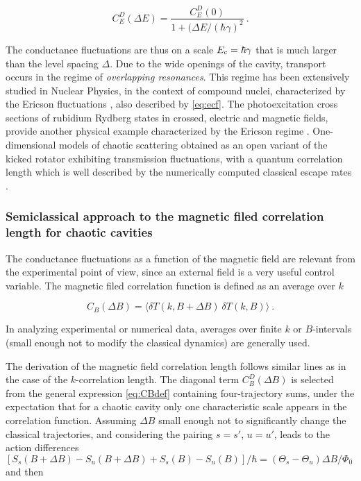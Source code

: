 \documentclass[a4paper,10pt]{article}
\newcommand{\nin}{\noindent}
\newcommand{\be}{\begin{equation}}
\newcommand{\ee}{\end{equation}}
\newcommand{\dlB}{\Delta B}
\newcommand{\dlT}{\delta T}
\begin{document}
\be
C_E^D (\Delta E) = \frac{C_E^D(0)}{1 + (\Delta E/(\hbar \gamma)^2} \ .
\label{eq:ecf}
\ee

\nin The conductance fluctuations are thus on a scale $E_{\rm c}=\hbar \gamma$ that is much larger than the level spacing $\Delta$. Due to the wide openings of the cavity, transport occurs in the regime of {\it overlapping resonances}. This regime has been extensively studied in 
Nuclear Physics, in the context of compound nuclei, characterized by the Ericson fluctuations \cite{Eric60}, also described by \eqref{eq:ecf}.
The photoexcitation cross sections of rubidium Rydberg states in crossed, electric and magnetic fields, provide another physical example characterized by the Ericson regime \cite{Madr05}. One-dimensional models of chaotic scattering obtained as an open variant of the kicked rotator exhibiting transmission fluctuations, with a quantum correlation length which is well described by the numerically computed classical escape rates \cite{borguar}.

\subsubsection{Semiclassical approach to the magnetic filed correlation length for chaotic cavities}
\label{subsubsec:cfmfc}

\nin The conductance fluctuations as a function of the magnetic field are relevant from the experimental point of view, since an external field is a very useful control variable. The magnetic filed correlation function is
defined as an average over $k$

\be
C_B( \dlB ) = \langle \dlT (k,B+\dlB) \ \dlT (k,B) \rangle \ .
\label{eq:CBdef}
\ee

\nin In analyzing experimental or numerical data, averages over finite $k$ or $B$-intervals (small enough not to modify the classical 
dynamics) are generally used. 

\nin The derivation of the magnetic field correlation length \cite{Jal90}
follows similar lines as in the case of the $k$-correlation length. The diagonal term $C_B^D( \dlB )$ is selected from the general expression \eqref{eq:CBdef} containing four-trajectory sums, under the expectation that for a chaotic cavity only one characteristic scale appears in the correlation function.  Assuming $\dlB$ small enough not to significantly change the classical trajectories, and considering the pairing $s\!=\!s'$, $u\!=\!u'$, leads to the action differences $[ S_s(B+\dlB) - S_u(B+\dlB) + S_s(B) - S_u(B) ]/ \hbar = (\Theta_s - \Theta_u) \dlB/ \Phi_0$ and then 
\end{document}
